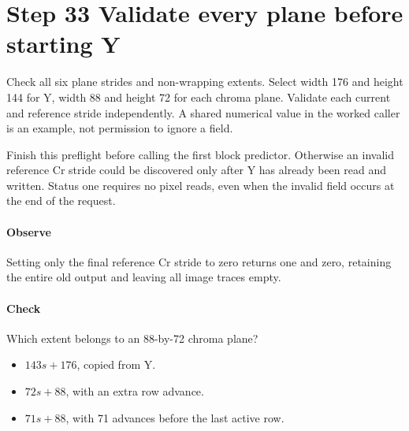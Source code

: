 \section{Step 33 Validate every plane before starting Y}\label{h263-macroblock-s03}
Check all six plane strides and non-wrapping extents. Select width 176 and height
144 for Y, width 88 and height 72 for each chroma plane. Validate each current and
reference stride independently. A shared numerical value in the worked caller
is an example, not permission to ignore a field.

Finish this preflight before calling the first block predictor. Otherwise an
invalid reference Cr stride could be discovered only after Y has already been
read and written. Status one requires no pixel reads, even when the invalid
field occurs at the end of the request.

\paragraph{Observe} Setting only the final reference Cr stride to zero returns
one and zero, retaining the entire old output and leaving all image traces empty.
\paragraph{Check} Which extent belongs to an 88-by-72 chroma plane?
\begin{itemize}
  \item[A.] $143s+176$, copied from Y.
  \item[B.] $72s+88$, with an extra row advance.
  \item[C.] $71s+88$, with 71 advances before the last active row.
\end{itemize}
